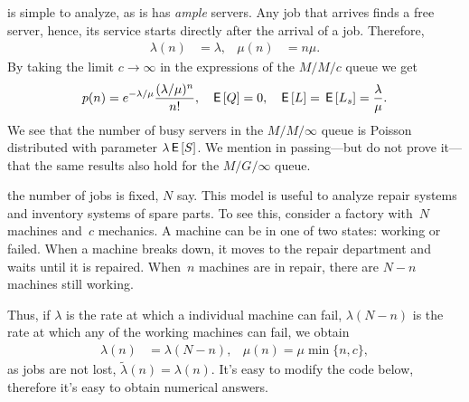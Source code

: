 \documentclass[queueing-book.tex]{subfiles}
\begin{document}
 is simple to analyze, as is has \emph{ample} servers.
Any job that arrives finds a free server, hence, its service  starts directly after the arrival of a job.
Therefore,
\begin{align*}
\lambda(n)&=\lambda, & \mu(n) &= n \mu.
\end{align*}
By taking the limit $c\to \infty$ in the expressions of the $M/M/c$ queue we get
\begin{align*}
  p(n) &= e^{-\lambda/\mu} \frac{(\lambda/\mu)^n}{n!}, & \,\mathsf{E}\left[Q\right]&=0, & \,\mathsf{E}\left[L\right] = \,\mathsf{E}\left[L_s\right] = \frac \lambda \mu.
\end{align*}
We see that the number of busy servers in the $M/M/\infty$ queue is Poisson distributed with parameter $\lambda \,\mathsf{E}\left[S\right]$.
We mention in passing---but do not prove it---that the same results also hold for the $M/G/\infty$ queue.

 the number of jobs is fixed, $N$ say.
This model is useful to analyze repair systems and inventory systems of spare parts.
To see this, consider a factory with~$N$ machines and~$c$ mechanics.
A machine can be in one of two states: working or failed.
When a machine breaks down, it moves to the repair department and waits until it is repaired.
When~$n$ machines are in repair, there are $N-n$ machines still working.

Thus, if $\lambda$ is the rate at which a individual machine can fail, $\lambda(N-n)$ is the rate at which any of the working machines can fail,
we obtain
\begin{align*}
  \lambda(n) &= \lambda (N-n), & \mu(n) = \mu \min\{n, c\},
\end{align*}
as jobs are not lost, $\tilde \lambda(n) = \lambda(n)$.
It's easy to modify the code below, therefore it's easy to obtain numerical answers.

\end{document}
